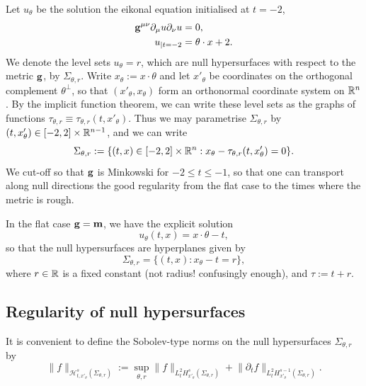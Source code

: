 
Let $u_\theta$ be the solution the eikonal equation initialised at $t = -2$, 
    \begin{equation}
        \begin{split}
        {\bf g}^{\mu\nu} \partial_\mu u \partial_\nu u 
            &= 0,\\
         u_{|t = -2}
            &= \theta \cdot x + 2. 
        \end{split}
    \end{equation}
We denote the level sets $u_\theta = r$, which are null hypersurfaces with respect to the metric ${\bf g}$, by $\Sigma_{\theta, r}$. Write $x_\theta := x \cdot \theta$ and let $x'_\theta$ be coordinates on the orthogonal complement $\theta^\perp$, so that $(x'_\theta, x_\theta)$ form an orthonormal coordinate system on $\mathbb R^n$. By the implicit function theorem, we can write these level sets as the graphs of functions $\tau_{\theta, r} \equiv \tau_{\theta, r} (t, x'_\theta)$. Thus we may parametrise $\Sigma_{\theta, r}$ by $(t, x'_\theta) \in [-2, 2] \times \mathbb R^{n - 1}$, and we can write 
    \[
        \Sigma_{\theta, r} 
            := \{ (t, x) \in [-2, 2] \times \mathbb R^n : x_\theta - \tau_{\theta, r} (t, x'_\theta) = 0 \}.
    \]
We cut-off so that ${\bf g}$ is Minkowski for $-2 \leq t \leq -1$, so that one can transport along null directions the good regularity from the flat case to the times where the metric is rough. 

\begin{example}
    In the flat case ${\bf g} = {\bf m}$, we have the explicit solution 
        \[
            u_\theta (t, x) 
                = x \cdot \theta - t,
        \]
    so that the null hypersurfaces are hyperplanes given by 
        \[
            \Sigma_{\theta, r} 
                = \{ (t, x) : x_\theta - t = r \},
        \]
    where $r \in \mathbb R$ is a fixed constant (not radius! confusingly enough), and $\tau := t + r$. 
\end{example}

\subsection{Regularity of null hypersurfaces}

It is convenient to define the Sobolev-type norms on the null hypersurfaces $\Sigma_{\theta, r}$ by
    \[
        \| f \|_{\mathcal H^s_{t, x'_\theta} (\Sigma_{\theta, r})}
            :=
                \sup_{\theta, r} \big\| f \big\|_{L^2_t H^s_{x'_\theta} (\Sigma_{\theta, r})} + \big\| \partial_t f \big\|_{L^2_t H^{s - 1}_{x'_\theta} (\Sigma_{\theta, r})}. 
    \]

